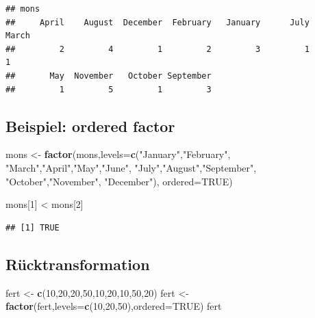 \documentclass[]{article}
\newenvironment{Shaded}{\begin{snugshade}}{\end{snugshade}}
\newcommand{\KeywordTok}[1]{\textcolor[rgb]{0.13,0.29,0.53}{\textbf{{#1}}}}
\newcommand{\DataTypeTok}[1]{\textcolor[rgb]{0.13,0.29,0.53}{{#1}}}
\newcommand{\DecValTok}[1]{\textcolor[rgb]{0.00,0.00,0.81}{{#1}}}
\newcommand{\StringTok}[1]{\textcolor[rgb]{0.31,0.60,0.02}{{#1}}}
\newcommand{\OtherTok}[1]{\textcolor[rgb]{0.56,0.35,0.01}{{#1}}}
\newcommand{\NormalTok}[1]{{#1}}
\begin{document}
\begin{verbatim}
## mons
##     April    August  December  February   January      July     March 
##         2         4         1         2         3         1         1 
##       May  November   October September 
##         1         5         1         3
\end{verbatim}

\subsection{Beispiel: ordered factor}\label{beispiel-ordered-factor}

\begin{Shaded}
\begin{Highlighting}[]
\NormalTok{mons <-}\StringTok{ }\KeywordTok{factor}\NormalTok{(mons,}\DataTypeTok{levels=}\KeywordTok{c}\NormalTok{(}\StringTok{"January"}\NormalTok{,}\StringTok{"February"}\NormalTok{,}
                             \StringTok{"March"}\NormalTok{,}\StringTok{"April"}\NormalTok{,}\StringTok{"May"}\NormalTok{,}\StringTok{"June"}\NormalTok{,}
                             \StringTok{"July"}\NormalTok{,}\StringTok{"August"}\NormalTok{,}\StringTok{"September"}\NormalTok{,  }
                             \StringTok{"October"}\NormalTok{,}\StringTok{"November"}\NormalTok{,}
                             \StringTok{"December"}\NormalTok{),}
               \DataTypeTok{ordered=}\OtherTok{TRUE}\NormalTok{)}

\NormalTok{mons[}\DecValTok{1}\NormalTok{] <}\StringTok{ }\NormalTok{mons[}\DecValTok{2}\NormalTok{]}
\end{Highlighting}
\end{Shaded}

\begin{verbatim}
## [1] TRUE
\end{verbatim}

\subsection{Rücktransformation}\label{rucktransformation}

\begin{Shaded}
\begin{Highlighting}[]
\NormalTok{fert <-}\StringTok{ }\KeywordTok{c}\NormalTok{(}\DecValTok{10}\NormalTok{,}\DecValTok{20}\NormalTok{,}\DecValTok{20}\NormalTok{,}\DecValTok{50}\NormalTok{,}\DecValTok{10}\NormalTok{,}\DecValTok{20}\NormalTok{,}\DecValTok{10}\NormalTok{,}\DecValTok{50}\NormalTok{,}\DecValTok{20}\NormalTok{)}
\NormalTok{fert <-}\StringTok{ }\KeywordTok{factor}\NormalTok{(fert,}\DataTypeTok{levels=}\KeywordTok{c}\NormalTok{(}\DecValTok{10}\NormalTok{,}\DecValTok{20}\NormalTok{,}\DecValTok{50}\NormalTok{),}\DataTypeTok{ordered=}\OtherTok{TRUE}\NormalTok{)}
\NormalTok{fert}
\end{Highlighting}
\end{Shaded}
\end{document}
